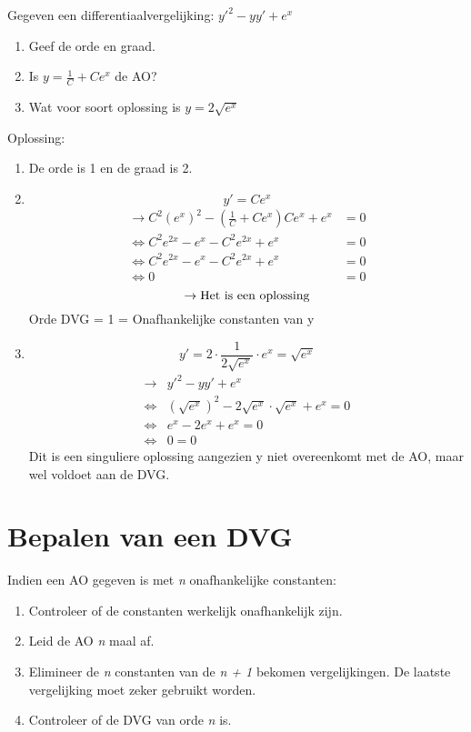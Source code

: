 {Gegeven een differentiaalvergelijking: $y'^2 - yy'+e^x$
\begin{enumerate}
\item Geef de orde en graad.
\item Is $y = \frac{1}{C} + Ce^x$ de AO?
\item Wat  voor soort oplossing is $y = 2\sqrt{e^x}$
\end{enumerate}
Oplossing:
\begin{enumerate}
\item 
De orde is 1 en de graad is 2.

\item 
$$y' = Ce^x$$
\begin{equation*}
\begin{split}
\rightarrow C^2(e^x)^2 - (\frac{1}{C} + Ce^x)Ce^x + e^x &  = 0 \\
\Leftrightarrow C^2e^{2x} - e^x - C^2e^{2x} + e^x &  = 0 \\
\Leftrightarrow C^2e^{2x} - e^x - C^2e^{2x} + e^x & = 0 \\
\Leftrightarrow 0 & =0
\end{split}
\end{equation*}
$$\rightarrow \hbox{Het is een oplossing}$$
Orde DVG = 1 = Onafhankelijke constanten van y

\item 
$$ y'  = 2 \cdot \frac{1}{2\sqrt{e^x}} \cdot e^x = \sqrt{e^x}$$
\begin{equation*}
\begin{split}
\rightarrow & y'^2 - yy'+e^x \\
\Leftrightarrow &  (\sqrt{e^x})^2 - 2\sqrt{e^x}\cdot\sqrt{e^x} + e^x  = 0 \\
\Leftrightarrow & e^x - 2e^x + e^x  = 0 \\
\Leftrightarrow & 0 = 0
\end{split}
\end{equation*}
Dit is een singuliere oplossing aangezien y niet overeenkomt met de AO, maar wel voldoet aan de DVG.

\end{enumerate}
}
\section{Bepalen van een DVG}
Indien een AO gegeven is met \textit{n} onafhankelijke constanten:
\begin{enumerate}
\item Controleer of de constanten werkelijk onafhankelijk zijn.
\item Leid de AO \textit{n} maal af.
\item Elimineer de \textit{n} constanten van de \textit{n + 1} bekomen vergelijkingen. De laatste vergelijking moet zeker gebruikt worden.
\item Controleer of de DVG van orde \textit{n} is.
\end{enumerate}

